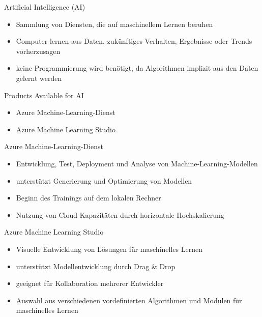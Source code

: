 \begin{flashcard}[Describe]{Artificial Intelligence (AI)}
    \begin{itemize}
        \item Sammlung von Diensten, die auf maschinellem Lernen beruhen
        \item Computer lernen aus Daten, zukünftiges Verhalten, Ergebnisse oder Trends vorherzusagen
        \item keine Programmierung wird benötigt, da Algorithmen implizit aus den Daten gelernt werden
    \end{itemize}

\end{flashcard}

\begin{flashcard}[Describe]{Products Available for AI}
    \begin{itemize}
        \item Azure Machine-Learning-Dienst
        \item Azure Machine Learning Studio
    \end{itemize}

\end{flashcard}

\begin{flashcard}[Describe]{Azure Machine-Learning-Dienst}
    \begin{itemize}
        \item Entwicklung, Test, Deployment und Analyse von Machine-Learning-Modellen
        \item unterstützt Generierung und Optimierung von Modellen
        \item Beginn des Trainings auf dem lokalen Rechner
        \item Nutzung von Cloud-Kapazitäten durch horizontale Hochskalierung
    \end{itemize}
\end{flashcard}

\begin{flashcard}[Describe]{Azure Machine Learning Studio}
    \begin{itemize}
        \item Visuelle Entwicklung von Lösungen für maschinelles Lernen
        \item unterstützt Modellentwicklung durch Drag \& Drop
        \item geeignet für Kollaboration mehrerer Entwickler
        \item Auswahl aus verschiedenen vordefinierten Algorithmen und Modulen für maschinelles Lernen
    \end{itemize}
\end{flashcard}

